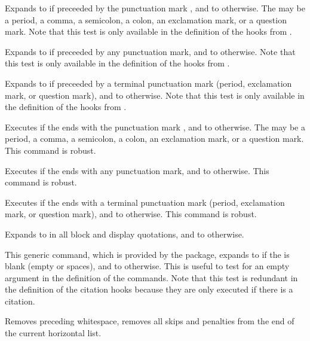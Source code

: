 \documentclass{ltxdockit}[2010/09/26]
\begin{document}
\begin{ltxsyntax}


Expands to  if preceeded by the punctuation mark , and to  otherwise. The  may be a period, a comma, a semicolon, a colon, an exclamation mark, or a question mark. Note that this test is only available in the definition of the hooks from .


Expands to  if preceeded by any punctuation mark, and to  otherwise. Note that this test is only available in the definition of the hooks from .


Expands to  if preceeded by a terminal punctuation mark (period, exclamation mark, or question mark), and to  otherwise. Note that this test is only available in the definition of the hooks from .


Executes  if the  ends with the punctuation mark , and to  otherwise. The  may be a period, a comma, a semicolon, a colon, an exclamation mark, or a question mark. This command is robust.


Executes  if the  ends with any punctuation mark, and to  otherwise. This command is robust.


Executes  if the  ends with a terminal punctuation mark (period, exclamation mark, or question mark), and to  otherwise. This command is robust.


Expands to  in all block and display quotations, and to  otherwise.


This generic command, which is provided by the  package, expands to  if the  is blank (empty or spaces), and to  otherwise. This is useful to test for an empty argument in the definition of the  commands. Note that this test is redundant in the definition of the citation hooks because they are only executed if there is a citation.


Removes preceding whitespace, \ie removes all skips and penalties from the end of the current horizontal list.

\end{ltxsyntax}
\end{document}
